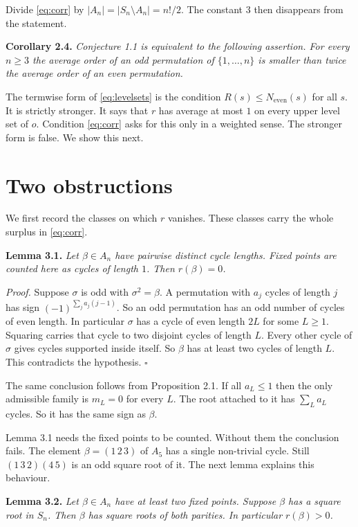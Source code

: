 \documentclass[10pt]{article}
\begin{document}
\medskip
Divide \eqref{eq:corr} by $|A_n|=|S_n\setminus A_n|=n!/2$. The constant $3$ then disappears
from the statement.

\medskip\noindent
\textbf{Corollary 2.4.} \emph{Conjecture 1.1 is equivalent to the following assertion. For
every $n\ge3$ the average order of an odd permutation of $\{1,\dots,n\}$ is smaller than
twice the average order of an even permutation.}

\medskip
The termwise form of \eqref{eq:levelsets} is the condition $R(s)\le N_{\mathrm{even}}(s)$
for all $s$. It is strictly stronger. It says that $r$ has average at most $1$ on every
upper level set of $o$. Condition \eqref{eq:corr} asks for this only in a weighted sense.
The stronger form is false. We show this next.

\section{Two obstructions}\label{sec:obstructions}

We first record the classes on which $r$ vanishes. These classes carry the whole surplus in
\eqref{eq:corr}.

\medskip\noindent
\textbf{Lemma 3.1.} \emph{Let $\beta\in A_n$ have pairwise distinct cycle lengths. Fixed
points are counted here as cycles of length $1$. Then $r(\beta)=0$.}

\medskip\noindent
\textit{Proof.} Suppose $\sigma$ is odd with $\sigma^{2}=\beta$. A permutation with $a_j$
cycles of length $j$ has sign $(-1)^{\sum_j a_j(j-1)}$. So an odd permutation has an odd
number of cycles of even length. In particular $\sigma$ has a cycle of even length $2L$ for
some $L\ge1$. Squaring carries that cycle to two disjoint cycles of length $L$. Every other
cycle of $\sigma$ gives cycles supported inside itself. So $\beta$ has at least two cycles
of length $L$. This contradicts the hypothesis. $\square$

\medskip
The same conclusion follows from Proposition 2.1. If all $a_L\le1$ then the only admissible
family is $m_L=0$ for every $L$. The root attached to it has $\sum_L a_L$ cycles. So it has
the same sign as $\beta$.

Lemma 3.1 needs the fixed points to be counted. Without them the conclusion fails. The
element $\beta=(1\,2\,3)$ of $A_5$ has a single non-trivial cycle. Still $(1\,3\,2)(4\,5)$
is an odd square root of it. The next lemma explains this behaviour.

\medskip\noindent
\textbf{Lemma 3.2.} \emph{Let $\beta\in A_n$ have at least two fixed points. Suppose $\beta$
has a square root in $S_n$. Then $\beta$ has square roots of both parities. In particular
$r(\beta)>0$.}
\end{document}
